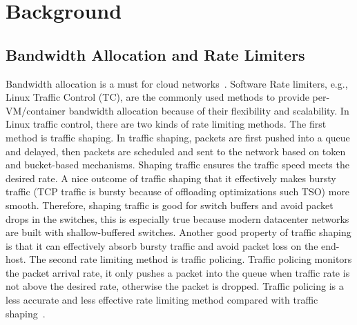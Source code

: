 \section{Background}
\label{rate-limiter:sec:background}


\subsection{Bandwidth Allocation and Rate Limiters}
\label{sec:bandwidth-allocation-in-clouds}
Bandwidth allocation is a must for cloud networks~\cite{shieh2011sharing,jeyakumar2013eyeq,rodrigues2011gatekeeper}. 
Software Rate limiters, e.g., Linux Traffic Control (TC), are the commonly used methods
to provide per-VM/container bandwidth allocation because of their flexibility and scalability.
In Linux traffic control, there are two kinds of rate limiting methods.
The first method is traffic shaping. In traffic shaping, packets are first pushed into a queue and delayed,
then packets are scheduled and sent to the network based on token and bucket-based mechanisms.
Shaping traffic ensures the traffic speed meets the desired rate.
A nice outcome of traffic shaping that it effectively makes bursty traffic
(TCP traffic is bursty because of offloading optimizations such TSO) more smooth.
Therefore, shaping traffic is good for switch buffers and avoid packet drops in the switches,
this is especially true because modern datacenter networks are built with shallow-buffered switches.
Another good property of traffic shaping is that it can effectively absorb bursty traffic and avoid
packet loss on the end-host.
The second rate limiting method is traffic policing. Traffic policing monitors the packet arrival rate,
it only pushes a packet into the queue when traffic rate is not above the desired rate,
otherwise the packet is dropped. Traffic policing is a less accurate and less effective
rate limiting method compared with traffic shaping~\cite{ovs-qos}.

